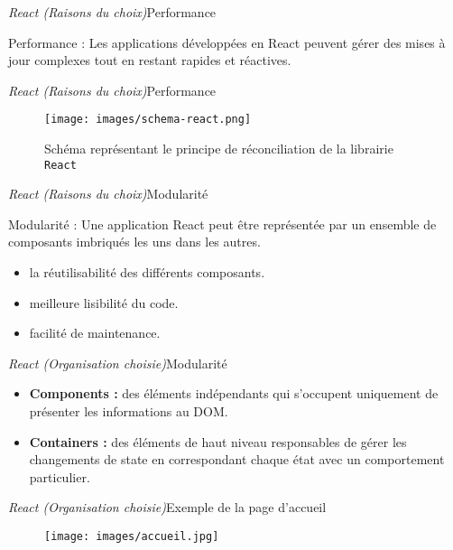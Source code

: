 \documentclass[usenames,dvipsnames]{beamer}
\begin{document}
\begin{frame}{\textit{React (Raisons du choix)}}{Performance}
  \begin{block}{Performance :}
  Les applications développées en React peuvent gérer des mises à jour complexes tout en restant rapides et réactives.
  \end{block}
\end{frame}

\begin{frame}{\textit{React (Raisons du choix)}}{Performance}
  \begin{figure}
    \texttt{[image: images/schema-react.png]}
    \caption{Schéma représentant le principe de réconciliation de la librairie \texttt{React}}
  \end{figure}
\end{frame}

\begin{frame}{\textit{React (Raisons du choix)}}{Modularité}
  \begin{block}{Modularité :}
  Une application React peut être représentée par un ensemble de composants imbriqués les uns dans les autres.
  \end{block}

  \begin{itemize}
    \item la réutilisabilité des différents composants.
    \item meilleure lisibilité du code.
    \item facilité de maintenance.
  \end{itemize}
\end{frame}

\begin{frame}{\textit{React (Organisation choisie)}}{Modularité}
  \begin{itemize}
    \item \textbf{Components :} des éléments indépendants qui s’occupent uniquement de présenter les informations au DOM.
    \item \textbf{Containers :} des éléments de haut  niveau responsables de gérer les changements de state en correspondant chaque état avec un comportement particulier.
  \end{itemize}
\end{frame}

\begin{frame}{\textit{React (Organisation choisie)}}{Exemple de la page d'accueil}
  \begin{figure}
    \texttt{[image: images/accueil.jpg]}
  \end{figure}
\end{frame}
\end{document}
